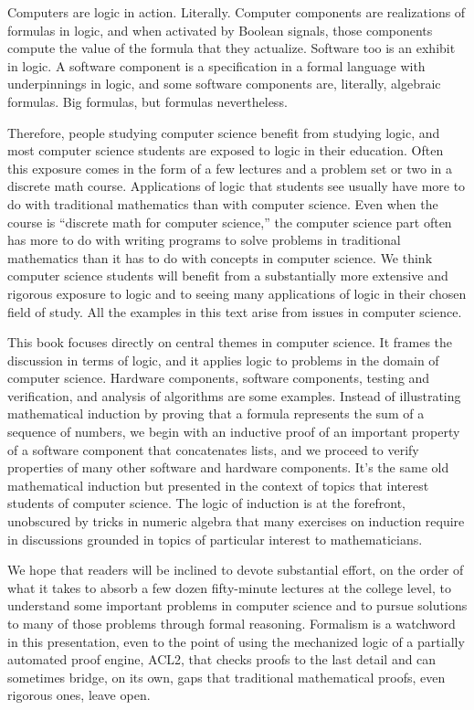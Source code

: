 \begin{preface}
Computers are logic in action. Literally.
Computer components are realizations of formulas in logic,
and when activated by Boolean signals, those components
compute the value of the formula that they actualize.
Software too is an exhibit in logic.
A software component is a specification in a formal language
with underpinnings in logic,
and some software components
are, literally, algebraic formulas.
Big formulas, but formulas nevertheless.

Therefore, people studying computer science
benefit from studying logic, and
most computer science students
are exposed to logic in their education.
Often this exposure comes
in the form of a few lectures and a problem set or two
in a discrete math course. Applications of logic that
students see usually have more to do with traditional mathematics
than with computer science. Even when the course
is ``discrete math for computer science,'' the computer science
part often has more to do with writing programs to solve problems
in traditional mathematics than it has to do with
concepts in computer science.
We think computer science students will
benefit from a substantially more extensive and rigorous
exposure to logic and to seeing many applications of
logic in their chosen field of study.
All the examples in this text arise from issues in computer science.

This book focuses directly on central themes
in computer science.
It frames the discussion in terms of logic,
and it applies logic to problems in the domain of computer science.
Hardware components, software components,
testing and verification, and analysis of algorithms
are some examples.
Instead of illustrating mathematical induction by proving
that a formula represents the sum of a sequence of numbers,
we begin with an inductive proof of an important property of
a software component that concatenates lists,
and we proceed to verify properties of
many other software and hardware components.
It's the same old mathematical induction but presented
in the context of topics that interest
students of computer science.
The logic of induction is at the forefront,
unobscured by tricks in numeric algebra
that many exercises on induction require in
discussions grounded in topics
of particular interest to mathematicians.

We hope that readers will be inclined
to devote substantial effort, on the order
of what it takes to absorb a few dozen fifty-minute
lectures at the college level,
to understand some important problems in computer science and
to pursue solutions to many of those problems through formal reasoning.
Formalism is a watchword in this presentation, even to the
point of using the mechanized logic of a partially automated proof engine,
ACL2, that checks proofs to the last detail and can sometimes
bridge, on its own, gaps that traditional mathematical
proofs, even rigorous ones, leave open.


\end{preface}
